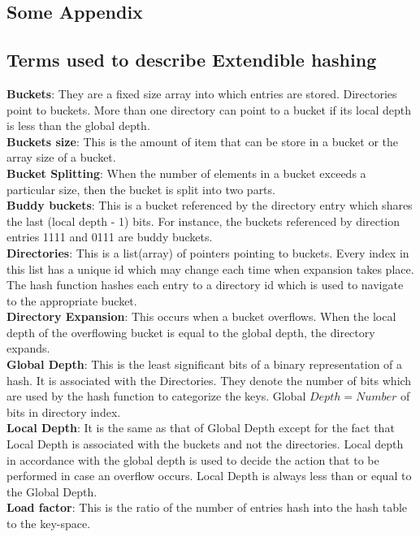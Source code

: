 \documentclass[a4paper,12pt, openany]{book}
\begin{document}
\begin{appendices}
	\chapter{Some Appendix}
	 \section{Terms used to describe Extendible hashing} 
	 \textbf{Buckets}: They are a fixed size array into which  entries are stored.  Directories point to buckets. More than one directory can point to a bucket if its local depth is less than the global depth.\\
	 \textbf{Buckets size}: This is the amount of item that can be store in a bucket or the array size of a bucket.\\
	\textbf{Bucket Splitting}: When the number of elements in a bucket exceeds a particular size, then the bucket is split into two parts.\\
	\textbf{Buddy buckets}: This is a bucket referenced by the directory entry which shares the last (local depth - 1) bits. For instance, the buckets
		referenced by direction entries 1111 and 0111
		are buddy buckets.\\
	\textbf{Directories}: This is a list(array) of pointers pointing to buckets. Every index in this list has a unique id which may change each time when expansion takes place. The hash function hashes each entry to a directory id which is used to navigate to the appropriate bucket. \\	\textbf{Directory Expansion}: This occurs when a bucket overflows. When the local depth of the overflowing bucket is equal to the global depth, the directory expands.\\	
	\textbf{Global Depth}: This is the least significant bits of a binary representation of a hash. It is associated with the Directories. They denote the number of bits which are used by the hash function to categorize the keys. Global $Depth = Number$ of bits in directory index.\\
	\textbf{Local Depth}: It is the same as that of Global Depth except for the fact that Local Depth is associated with the buckets and not the directories. Local depth in accordance with the global depth is used to decide the action that to be performed in case an overflow occurs. Local Depth is always less than or equal to the Global Depth.\\
	\textbf{Load factor}: This is the ratio of the number of entries hash into the hash table to the key-space.

\end{appendices}
\end{document}
